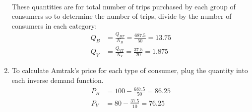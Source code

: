\documentclass{article}
\begin{document}
\begin{enumerate}
\begin{align*}
    \end{align*}
    These quantities are for total number of trips purchased by each group of
    consumers so to determine the number of trips, divide by the number of
    consumers in each category:
    \begin{align*}
        Q_{B}&=\frac{Q_{BT}}{N_{B}}=\frac{687.5}{50}=\bm{13.75}\\
        Q_{V}&=\frac{Q_{VT}}{N_{V}}=\frac{37.5}{20}=\bm{1.875}
    \end{align*}
    \item To calculate Amtrak's price for each type of consumer, plug the
        quantity into each inverse demand function. 
    \begin{align*}
        P_{B}&=100-\frac{687.5}{50}=\bm{86.25}\\
        P_{V}&=80-\frac{37.5}{10}=\bm{76.25}
    \end{align*}
    
\end{enumerate}
\end{document}
